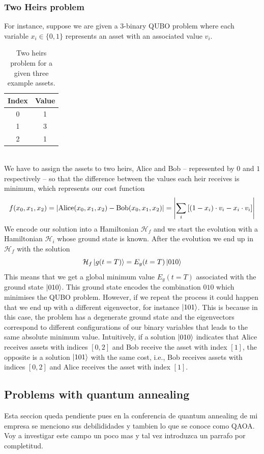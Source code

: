 \subsubsection{Two Heirs problem}
For instance, suppose we are given a 3-binary QUBO problem where each variable $x_{i} \in \{0,1\}$ represents an asset with an associated value $v_{i}$.
\begin{table}[h]
\label{tab:Assets}
\centering
\begin{tabular}{ c | c }
  \hline			
  Index & Value  \\
    \hline		
   0 & 1\\
       \hline		
   1 & 3\\
       \hline		
   2 & 1
\end{tabular}
\caption{Two heirs problem for a given three example assets.}
\end{table}
\\
We have to assign the assets to two heirs, Alice and Bob -- represented by $0$ and $1$ respectively -- so that the difference between the values each heir receives is minimum, which represents our cost function
\begin{equation}
    f(x_{0}, x_{1}, x_{2}) = \abs{\text{Alice}(x_{0}, x_{1}, x_{2}) - \text{Bob}(x_{0}, x_{1}, x_{2})} = \abs{\sum_{i}\left[(1-x_{i})\cdot v_{i} - x_{i}\cdot v_{i}\right]}
\end{equation}
We encode our solution into a Hamiltonian $\mathcal{H}_{f}$ and we start the evolution with a Hamiltonian $\mathcal{H}_{i}$ whose ground state is known. After the evolution we end up in $\mathcal{H}_{f}$ with the solution
\begin{equation}
    \mathcal{H}_{f}\ket{g(t=T)} = E_{g}(t=T)\ket{010}
\end{equation}
This means that we get a global minimum value $E_{g}(t=T)$ associated with the ground state $\ket{010}$. This ground state encodes the combination $010$ which minimises the QUBO problem. However, if we repeat the process it could happen that we end up with a different eigenvector, for instance $\ket{101}$. This is because in this case, the problem has a degenerate ground state and the eigenvectors correspond to different configurations of our binary variables that leads to the same absolute minimum value. Intuitively, if a solution $\ket{010}$ indicates that Alice receives assets with indices $[0,2]$ and Bob receive the asset with index $[1]$, the opposite is a solution $\ket{101}$ with the same cost, i.e., Bob receives assets with indices $[0,2]$ and Alice receives the asset with index $[1]$.
\subsection{Problems with quantum annealing}
Esta seccion queda pendiente pues en la conferencia de quantum annealing de mi empresa se menciono sus debilididades y tambien lo que se conoce como QAOA. Voy a investigar este campo un poco mas y tal vez introduzca un parrafo por completitud.
